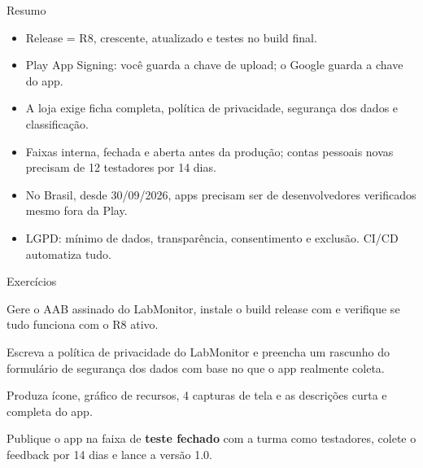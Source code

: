 \documentclass[aspectratio=169,10pt]{beamer}
\begin{document}
\begin{frame}{Resumo}
  \begin{resumo}
    \begin{itemize}
      \item Release = R8,  crescente,  atualizado e testes no build final.
      \item Play App Signing: você guarda a chave de upload; o Google guarda a chave do app.
      \item A loja exige ficha completa, política de privacidade, segurança dos dados e classificação.
      \item Faixas interna, fechada e aberta antes da produção; contas pessoais novas precisam de 12 testadores por 14 dias.
      \item No Brasil, desde 30/09/2026, apps precisam ser de desenvolvedores verificados mesmo fora da Play.
      \item LGPD: mínimo de dados, transparência, consentimento e exclusão. CI/CD automatiza tudo.
    \end{itemize}
  \end{resumo}
\end{frame}

\begin{frame}{Exercícios}
  \begin{exercicio}
    Gere o AAB assinado do LabMonitor, instale o build release com  e verifique se tudo funciona com o R8 ativo.
  \end{exercicio}
  \begin{exercicio}
    Escreva a política de privacidade do LabMonitor e preencha um rascunho do formulário de segurança dos dados com base no que o app realmente coleta.
  \end{exercicio}
  \begin{exercicio}
    Produza ícone, gráfico de recursos, 4 capturas de tela e as descrições curta e completa do app.
  \end{exercicio}
  \begin{projeto}
    Publique o app na faixa de \textbf{teste fechado} com a turma como testadores, colete o feedback por 14 dias e lance a versão 1.0.
  \end{projeto}
\end{frame}
\end{document}
